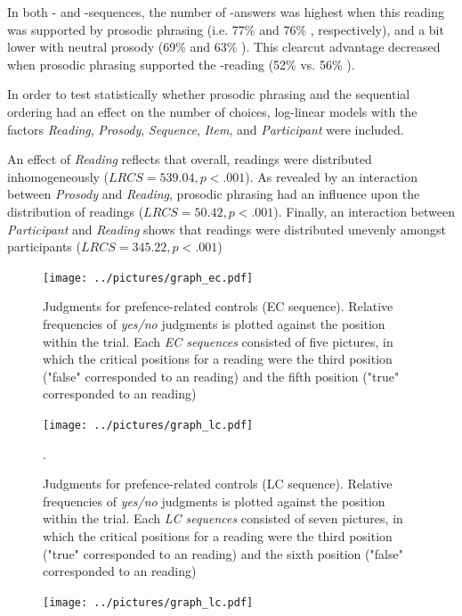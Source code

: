 \documentclass[fleqn,reqno,10pt,draft]{article}
\newcommand{\lc}{\acro{lc}}
\newcommand{\ec}{\acro{ec}}
\begin{document}
In both \lc- and \ec-sequences, the number of \lc-answers was highest when this reading
was supported by prosodic phrasing (i.e. 77\%  and 76\% , respectively), and a bit lower
with neutral prosody (69\%  and 63\% ). This clearcut advantage decreased when prosodic
phrasing supported the \ec-reading (52\%  vs. 56\% ).

In order to test statistically whether prosodic phrasing and the sequential ordering 
had an effect on the number of \lc choices, log-linear models with the factors
{\it Reading}, {\it Prosody}, {\it Sequence}, {\it Item}, and {\it Participant} were included.

An effect of {\it Reading} reflects that overall, readings were distributed inhomogeneously
($LRCS = 539.04, p < .001$). As revealed by an interaction between {\it Prosody} and
{\it Reading}, prosodic phrasing had an influence upon the distribution of readings 
($LRCS = 50.42, p < .001$). Finally, an interaction between {\it Participant} and {\it Reading}
shows that readings were distributed unevenly amongst participants ($LRCS = 345.22, p < .001$)




\begin{figure}
\texttt{[image: ../pictures/graph\_ec.pdf]}
\caption{Judgments for prefence-related controls (EC sequence). Relative frequencies
of {\it yes/no} judgments is plotted against the position within the
trial. Each {\it EC sequences} consisted of five pictures, in which the
critical positions for a reading were the third position ("false" corresponded
to an \ec reading) and the fifth position ("true" corresponded to an \lc reading)}
\label{Fig:EC_judgments}
\end{figure}


\begin{figure}
\texttt{[image: ../pictures/graph\_lc.pdf]}
\caption{Judgments for prefence-related controls (LC sequence). Relative frequencies
of {\it yes/no} judgments is plotted against the position within the
trial. Each {\it LC sequences} consisted of seven pictures, in which the
critical positions for a reading were the third position ("true" corresponded
to an \lc reading) and the sixth position ("false" corresponded to an \ec reading)}
\label{Fig:LC_judgments}.
\end{figure}




\begin{figure}

\texttt{[image: ../pictures/graph\_lc.pdf]}

\end{figure}
\end{document}
